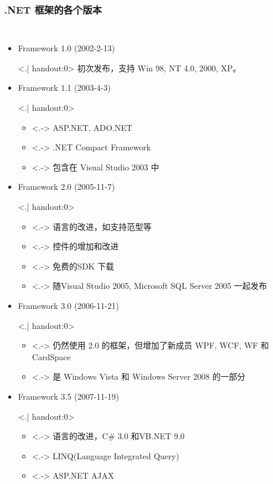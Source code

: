 \begin{frame}[t]
\frametitle{.NET 框架的各个版本}

\begin{columns}[t]
\begin{itemize}[<+->]
\small
\item Framework 1.0 (2002-2-13)

\only<.| handout:0>{ \CJKindent 初次发布，支持 Win 98, NT 4.0, 2000, XP。}

\item Framework 1.1 (2003-4-3)

\only<.| handout:0>{
\begin{itemize}
\item<.-> ASP.NET, ADO.NET
\item<.-> .NET Compact Framework
\item<.-> 包含在 Visual Studio 2003 中
\end{itemize}}

\item Framework 2.0 (2005-11-7)

\only<.| handout:0>{
\begin{itemize}
\item<.-> 语言的改进，如支持范型等
\item<.-> 控件的增加和改进
\item<.-> 免费的SDK 下载
\item<.-> 随Visual Studio 2005, Microsoft SQL Server 2005 一起发布
\end{itemize}}

\item Framework 3.0 (2006-11-21)

\only<.| handout:0>{
\begin{itemize}
\item<.-> 仍然使用 2.0 的框架，但增加了新成员 WPF, WCF, WF 和 CardSpace
\item<.-> 是 Windows Vista 和 Windows Server 2008 的一部分
\end{itemize}}

\item Framework 3.5 (2007-11-19)

\only<.| handout:0>{
\begin{itemize}
\item<.-> 语言的改进，C\# 3.0 和VB.NET 9.0
\item<.-> LINQ(Language Integrated Query)
\item<.-> ASP.NET AJAX
\end{itemize}}


\end{itemize}
\end{columns}
\end{frame}
